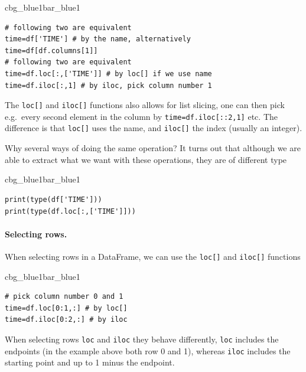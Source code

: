 \documentclass[%
oneside,                 %
final,                   %
10pt]{article}
\newenvironment{_pro_tight}[2]{
   \def\FrameCommand{\color{#2}\vrule width 1mm\normalcolor\colorbox{#1}}
   \FrameRule0.6pt\MakeFramed {\advance\hsize-2mm\FrameRestore}\vskip3mm}
   {\vskip0mm\endMakeFramed}
\newenvironment{pro}[2]{
\bgroup\rmfamily
\fboxsep=0mm\relax
\begin{_pro_tight}{#1}{#2}
\list{}{\parsep=-2mm\parskip=0mm\topsep=0pt\leftmargin=2mm
\rightmargin=2\leftmargin\leftmargin=4pt\relax}
\item\relax}
{\endlist\end{_pro_tight}\egroup}
\newenvironment{notice_mdfboxadmon}[1][]{
\begin{notice_mdfboxmdframed}[frametitle=#1]
}
{
\end{notice_mdfboxmdframed}
}
\begin{document}
\begin{pro}{cbg_blue1}{bar_blue1}\begin{Verbatim}[numbers=none,fontsize=\fontsize{9pt}{9pt},baselinestretch=0.95,xleftmargin=2mm]
# following two are equivalent
time=df['TIME'] # by the name, alternatively
time=df[df.columns[1]]
# following two are equivalent
time=df.loc[:,['TIME']] # by loc[] if we use name
time=df.iloc[:,1] # by iloc, pick column number 1

\end{Verbatim}
\end{pro}
\noindent

The \texttt{loc[]} and \texttt{iloc[]} functions also allows for list slicing, one can then pick e.g.~every second element in the column by \texttt{time=df.iloc[::2,1]} etc. The difference is that \texttt{loc[]} uses the name, and \texttt{iloc[]} the index (usually an integer). 

Why several ways of doing the same operation? It turns out that although we are able to extract what we want with these operations, they are of different type



\begin{pro}{cbg_blue1}{bar_blue1}\begin{Verbatim}[numbers=none,fontsize=\fontsize{9pt}{9pt},baselinestretch=0.95,xleftmargin=2mm]
print(type(df['TIME']))
print(type(df.loc[:,['TIME']]))

\end{Verbatim}
\end{pro}
\noindent

\paragraph{Selecting rows.}
When selecting rows in a DataFrame, we can use the \texttt{loc[]} and \texttt{iloc[]} functions




\begin{pro}{cbg_blue1}{bar_blue1}\begin{Verbatim}[numbers=none,fontsize=\fontsize{9pt}{9pt},baselinestretch=0.95,xleftmargin=2mm]
# pick column number 0 and 1
time=df.loc[0:1,:] # by loc[] 
time=df.iloc[0:2,:] # by iloc

\end{Verbatim}
\end{pro}
\noindent



\begin{notice_mdfboxadmon}
When selecting rows \texttt{loc} and \texttt{iloc} they behave differently, \texttt{loc} includes the endpoints (in the example above both row 0 and 1), whereas \texttt{iloc} includes the starting point and up to 1 minus the endpoint.
\end{notice_mdfboxadmon} %
\end{document}
